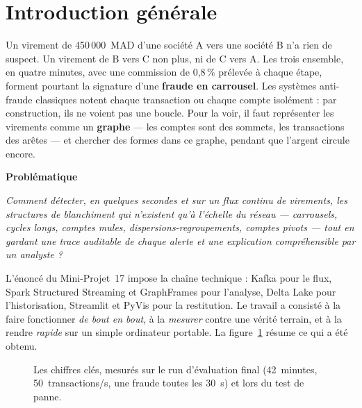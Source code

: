 \chapter*{Introduction générale}

Un virement de 450\,000~MAD d'une société A vers une société B n'a rien de
suspect. Un virement de B vers C non plus, ni de C vers A. Les trois ensemble,
en quatre minutes, avec une commission de 0,8\,\% prélevée à chaque étape,
forment pourtant la signature d'une \textbf{fraude en carrousel}. Les systèmes
anti-fraude classiques notent chaque transaction ou chaque compte isolément :
par construction, ils ne voient pas une boucle. Pour la voir, il faut
représenter les virements comme un \textbf{graphe} --- les comptes sont des
sommets, les transactions des arêtes --- et chercher des formes dans ce graphe,
pendant que l'argent circule encore.

\begin{tcolorbox}[colback=bleuclair, colframe=bleuprojet, boxrule=0pt, leftrule=3pt,
  arc=0pt, outer arc=0pt, left=8pt, right=8pt, top=6pt, bottom=6pt]
{\sffamily\bfseries\color{bleuprojet}Problématique}\par\smallskip
\emph{Comment détecter, en quelques secondes et sur un flux continu de
virements, les structures de blanchiment qui n'existent qu'à l'échelle du
réseau --- carrousels, cycles longs, comptes mules, dispersions-regroupements,
comptes pivots --- tout en gardant une trace auditable de chaque alerte et
une explication compréhensible par un analyste ?}
\end{tcolorbox}

L'énoncé du Mini-Projet~17 impose la chaîne technique : Kafka pour le flux,
Spark Structured Streaming et GraphFrames pour l'analyse, Delta Lake pour
l'historisation, Streamlit et PyVis pour la restitution. Le travail a consisté
à la faire fonctionner \emph{de bout en bout}, à la \emph{mesurer} contre une
vérité terrain, et à la rendre \emph{rapide} sur un simple ordinateur portable.
La figure~\ref{fig:chiffres} résume ce qui a été obtenu.

\begin{figure}[htp]
\centering
{}\hfill
{}\hfill
{}\hfill
{}
\caption[Les chiffres clés du projet]{Les chiffres clés, mesurés sur le run d'évaluation final
(42~minutes, 50~transactions/s, une fraude toutes les 30~s) et lors du test de panne.}
\label{fig:chiffres}
\end{figure}

